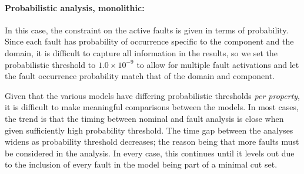 
\paragraph{Probabilistic analysis, monolithic:} In this case, the constraint on the active faults is given in terms of probability. Since each fault has probability of occurrence specific to the component and the domain, it is difficult to capture all information in the results, so we set the probabilistic threshold to $1.0 \times 10^{-9}$ to allow for multiple fault activations and let the fault occurrence probability match that of the domain and component. 

Given that the various models have differing probabilistic thresholds {\em per property}, it is difficult to make meaningful comparisons between the models. In most cases, the trend is that the timing between nominal and fault analysis is close when given sufficiently high probability threshold. The time gap between the analyses widens as probability threshold decreases; the reason being that more faults must be considered in the analysis. In every case, this continues until it levels out due to the inclusion of every fault in the model being part of a minimal cut set. 

